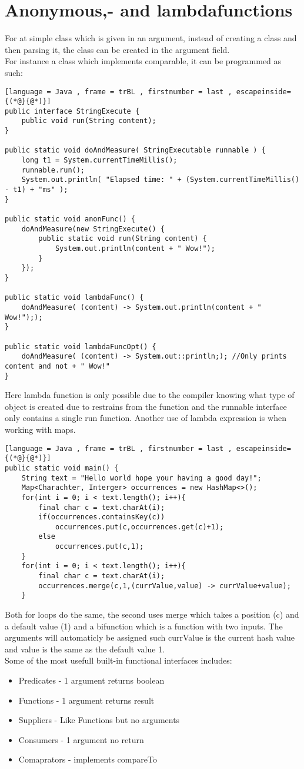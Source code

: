 \documentclass[12pt, a4paper]{article}
\begin{document}
	\section{Anonymous,- and lambdafunctions}
		For at simple class which is given in an argument, instead of creating a class and then parsing it, the class can be created in the argument field.\\
		For instance a class which implements comparable, it can be programmed as such:
\begin{lstlisting}[language = Java , frame = trBL , firstnumber = last , escapeinside={(*@}{@*)}]
public interface StringExecute {
	public void run(String content);
}
	
public static void doAndMeasure( StringExecutable runnable ) {
	long t1 = System.currentTimeMillis();
	runnable.run();
	System.out.println( "Elapsed time: " + (System.currentTimeMillis() - t1) + "ms" );
}

public static void anonFunc() {
	doAndMeasure(new StringExecute() {
		public static void run(String content) {
			System.out.println(content + " Wow!");
		}
	});
}

public static void lambdaFunc() {
	doAndMeasure( (content) -> System.out.println(content + " Wow!"););
}

public static void lambdaFuncOpt() {
	doAndMeasure( (content) -> System.out::println;); //Only prints content and not + " Wow!"
}
\end{lstlisting}
			Here lambda function is only possible due to the compiler knowing what type of object is created due to restrains from the function and the runnable interface only contains a single run function.
			Another use of lambda expression is when working with maps.
\begin{lstlisting}[language = Java , frame = trBL , firstnumber = last , escapeinside={(*@}{@*)}]
public static void main() {
	String text = "Hello world hope your having a good day!";
	Map<Charachter, Interger> occurrences = new HashMap<>();
	for(int i = 0; i < text.length(); i++){
		final char c = text.charAt(i);
		if(occurrences.containsKey(c))
			occurrences.put(c,occurrences.get(c)+1);
		else
			occurrences.put(c,1);
	}
	for(int i = 0; i < text.length(); i++){
		final char c = text.charAt(i);
		occurrences.merge(c,1,(currValue,value) -> currValue+value);
	}
\end{lstlisting}
		Both for loops do the same, the second uses merge which takes a position (c) and a default value (1) and a bifunction which is a function with two inputs. The arguments will automaticly be assigned such currValue is the current hash value and value is the same as the default value 1.\\
		Some of the most usefull built-in functional interfaces includes:
		\begin{itemize}
			\item Predicates - 1 argument returns boolean
			\item Functions - 1 argument returns result
			\item Suppliers - Like Functions but no arguments
			\item Consumers - 1 argument no return
			\item Comaprators - implements compareTo
		\end{itemize}
\end{document}
